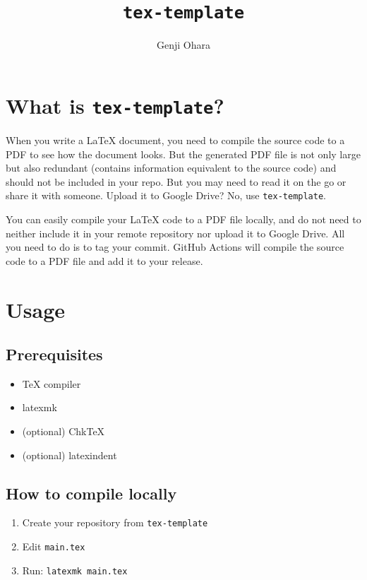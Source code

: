 \documentclass{article}
\title{\texttt{tex-template}}
\author{Genji Ohara}
\begin{document}
\maketitle

\section{What is \texttt{tex-template}?}

When you write a \LaTeX{} document,
you need to compile the source code to a PDF to see how the document looks.
But the generated PDF file is not only large but also redundant
(contains information equivalent to the source code)
and should not be included in your repo.
But you may need to read it on the go or share it with someone.
Upload it to Google Drive?
No, use \verb|tex-template|.

You can easily compile your \LaTeX{} code to a PDF file locally,
and do not need to neither include it in your remote repository
nor upload it to Google Drive.
All you need to do is to tag your commit.
GitHub Actions will compile the source code to a PDF file
and add it to your release.

\section{Usage}

\subsection{Prerequisites}

\begin{itemize}
  \item \TeX{} compiler
  \item latexmk
  \item (optional) Chk\TeX{}
  \item (optional) latexindent
\end{itemize}

\subsection{How to compile locally}

\begin{enumerate}
  \item Create your repository from \verb|tex-template|
  \item Edit \verb|main.tex|
  \item Run: \verb|latexmk main.tex|
\end{enumerate}
\end{document}

